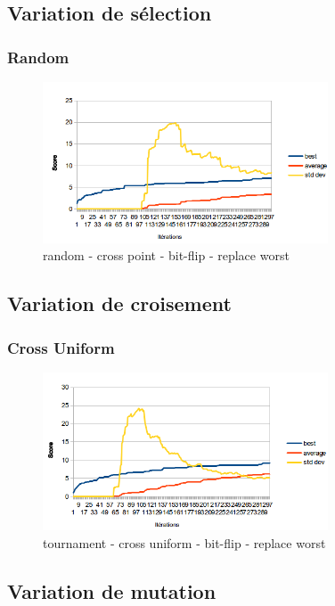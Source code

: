 \documentclass[a4paper,10pt]{report}
\begin{document}
\pagebreak
\subsection{Variation de sélection}
\subsubsection{Random}
\begin{figure}[h]
  \begin{center}
    \includegraphics[width=320px]{images/graph-random.png}
  \end{center}
  \caption{random - cross point - bit-flip - replace worst}
\end{figure}

\subsection{Variation de croisement}
\subsubsection{Cross Uniform}
\begin{figure}[h]
  \begin{center}
    \includegraphics[width=320px]{images/graph-cross-uniform.png}
  \end{center}
  \caption{tournament - cross uniform - bit-flip - replace worst}
\end{figure}

\pagebreak
\subsection{Variation de mutation}
\end{document}
